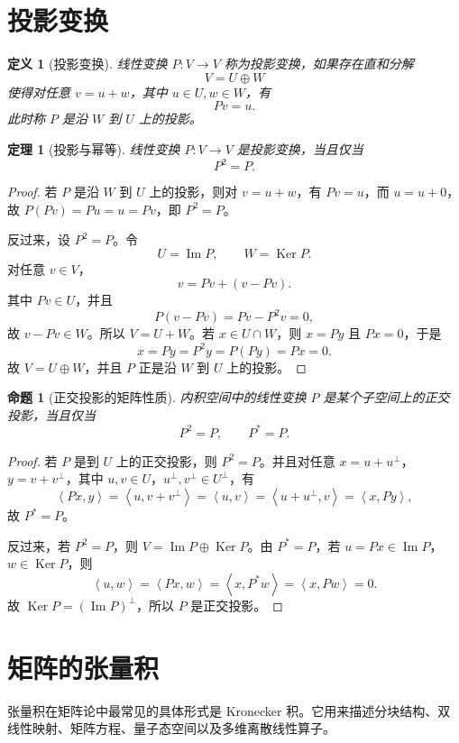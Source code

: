 \documentclass[UTF8,openany,zihao=-4]{ctexbook}
\theoremstyle{cnplain}
\newtheorem{definition}{定义}[chapter]
\newtheorem{theorem}{定理}[chapter]
\newtheorem{proposition}{命题}[chapter]
\newcommand{\Ker}{\operatorname{Ker}}
\newcommand{\Img}{\operatorname{Im}}
\newcommand{\inner}[2]{\left\langle #1,#2\right\rangle}
\begin{document}
\section{投影变换}

\begin{definition}[投影变换]
线性变换 $P:V\to V$ 称为投影变换，如果存在直和分解
\[
V=U\oplus W
\]
使得对任意 $v=u+w$，其中 $u\in U,w\in W$，有
\[
Pv=u.
\]
此时称 $P$ 是沿 $W$ 到 $U$ 上的投影。
\end{definition}

\begin{theorem}[投影与幂等]
线性变换 $P:V\to V$ 是投影变换，当且仅当
\[
P^2=P.
\]
\end{theorem}

\begin{proof}
若 $P$ 是沿 $W$ 到 $U$ 上的投影，则对 $v=u+w$，有 $Pv=u$，而 $u=u+0$，故 $P(Pv)=Pu=u=Pv$，即 $P^2=P$。

反过来，设 $P^2=P$。令
\[
U=\Img P,
\qquad W=\Ker P.
\]
对任意 $v\in V$，
\[
v=Pv+(v-Pv).
\]
其中 $Pv\in U$，并且
\[
P(v-Pv)=Pv-P^2v=0,
\]
故 $v-Pv\in W$。所以 $V=U+W$。若 $x\in U\cap W$，则 $x=Py$ 且 $Px=0$，于是
\[
x=Py=P^2y=P(Py)=Px=0.
\]
故 $V=U\oplus W$，并且 $P$ 正是沿 $W$ 到 $U$ 上的投影。
\end{proof}

\begin{proposition}[正交投影的矩阵性质]
内积空间中的线性变换 $P$ 是某个子空间上的正交投影，当且仅当
\[
P^2=P,
\qquad P^*=P.
\]
\end{proposition}

\begin{proof}
若 $P$ 是到 $U$ 上的正交投影，则 $P^2=P$。并且对任意 $x=u+u^\perp$，$y=v+v^\perp$，其中 $u,v\in U$，$u^\perp,v^\perp\in U^\perp$，有
\[
\inner{Px}{y}=\inner{u}{v+v^\perp}=\inner{u}{v}
=\inner{u+u^\perp}{v}=\inner{x}{Py},
\]
故 $P^*=P$。

反过来，若 $P^2=P$，则 $V=\Img P\oplus\Ker P$。由 $P^*=P$，若 $u=Px\in\Img P$，$w\in\Ker P$，则
\[
\inner{u}{w}=\inner{Px}{w}=\inner{x}{P^*w}=\inner{x}{Pw}=0.
\]
故 $\Ker P=(\Img P)^\perp$，所以 $P$ 是正交投影。
\end{proof}

\section{矩阵的张量积}

张量积在矩阵论中最常见的具体形式是 Kronecker 积。它用来描述分块结构、双线性映射、矩阵方程、量子态空间以及多维离散线性算子。
\end{document}
